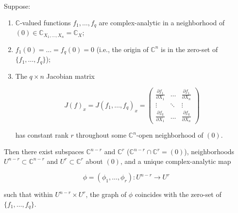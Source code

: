 Suppose:

\begin{enumerate}
\item $\mathbb{C}$-valued functions $f_1, \ldots, f_q$ are complex-analytic in a neighborhood of $(0) \in \mathbb{C}_{X_1, \ldots, X_n} = \mathbb{C}_X$;
\item $f_1(0) = \ldots = f_q(0) = 0$ (i.e., the origin of $\mathbb{C}^n$ is in the zero-set of $\{f_1, \ldots, f_q\}$);
\item The $q \times n$ Jacobian matrix

$$J(f)_x = J(f_1, \ldots, f_q)_x = \begin{pmatrix}
\frac{\partial f_1}{\partial X_1} & \ldots & \frac{\partial f_1}{\partial X_n} \\
\vdots & \ddots & \vdots \\
\frac{\partial f_q}{\partial X_1} & \ldots & \frac{\partial f_q}{\partial X_n}
\end{pmatrix}$$

has constant rank $r$ throughout some $\mathbb{C}^n$-open neighborhood of $(0)$.
\end{enumerate}

Then there exist subspaces $\mathbb{C}^{n-r}$ and $\mathbb{C}^r$ ($\mathbb{C}^{n-r} \cap \mathbb{C}^r = (0)$), neighborhoods $U^{n-r} \subset \mathbb{C}^{n-r}$ and $U^r \subset \mathbb{C}^r$ about $(0)$, and a unique complex-analytic map

$$\phi = (\phi_1, \ldots, \phi_r): U^{n-r} \to U^r$$

such that within $U^{n-r} \times U^r$, the graph of $\phi$ coincides with the zero-set of $\{f_1, \ldots, f_q\}$.
